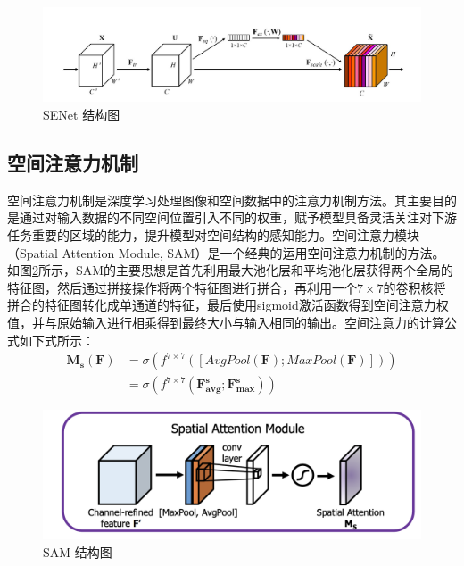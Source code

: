 \begin{figure}[h]
    \centering
    \includegraphics[width=14cm]{pic/chapter3/SENet.jpg}
    \caption{SENet 结构图}
    \label{SENet}
\end{figure}

\subsection{空间注意力机制}
空间注意力机制是深度学习处理图像和空间数据中的注意力机制方法。其主要目的是通过对输入数据的不同空间位置引入不同的权重，赋予模型具备灵活关注对下游任务重要的区域的能力，提升模型对空间结构的感知能力。空间注意力模块（Spatial Attention Module, SAM）是一个经典的运用空间注意力机制的方法。如图\ref{SAM}所示，SAM的主要思想是首先利用最大池化层和平均池化层获得两个全局的特征图，然后通过拼接操作将两个特征图进行拼合，再利用一个$7\times 7$的卷积核将拼合的特征图转化成单通道的特征，最后使用sigmoid激活函数\citing{}得到空间注意力权值，并与原始输入进行相乘得到最终大小与输入相同的输出。空间注意力的计算公式如下式所示：
\begin{equation}
    \begin{aligned}
        \mathbf{M}_{\mathbf{s}}\left( \mathbf{F} \right) & =\sigma \left( f^{7\times 7}\left( \left[ AvgPool\left( \mathbf{F} \right) ;MaxPool\left( \mathbf{F} \right) \right] \right) \right)
        \\
                                                         & =\sigma \left( f^{7\times 7}\left( \mathbf{F}_{\mathbf{avg}}^{\mathbf{s}};\mathbf{F}_{\mathbf{max}}^{\mathbf{s}} \right) \right)
    \end{aligned}
\end{equation}

\begin{figure}[h]
    \centering
    \includegraphics[width=14cm]{pic/chapter3/SAM.png}
    \caption{SAM 结构图}
    \label{SAM}
\end{figure}
